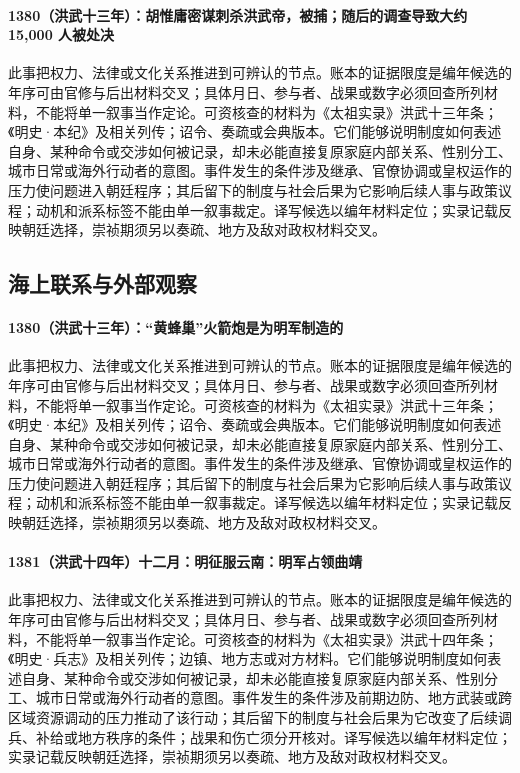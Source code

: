 \paragraph{1380（洪武十三年）：胡惟庸密谋刺杀洪武帝，被捕；随后的调查导致大约 15,000 人被处决} 此事把权力、法律或文化关系推进到可辨认的节点。账本的证据限度是编年候选的年序可由官修与后出材料交叉；具体月日、参与者、战果或数字必须回查所列材料，不能将单一叙事当作定论。可资核查的材料为《太祖实录》洪武十三年条；《明史·本纪》及相关列传；诏令、奏疏或会典版本。它们能够说明制度如何表述自身、某种命令或交涉如何被记录，却未必能直接复原家庭内部关系、性别分工、城市日常或海外行动者的意图。事件发生的条件涉及继承、官僚协调或皇权运作的压力使问题进入朝廷程序；其后留下的制度与社会后果为它影响后续人事与政策议程；动机和派系标签不能由单一叙事裁定。译写候选以编年材料定位；实录记载反映朝廷选择，崇祯期须另以奏疏、地方及敌对政权材料交叉。

\subsection{海上联系与外部观察}

\paragraph{1380（洪武十三年）：“黄蜂巢”火箭炮是为明军制造的} 此事把权力、法律或文化关系推进到可辨认的节点。账本的证据限度是编年候选的年序可由官修与后出材料交叉；具体月日、参与者、战果或数字必须回查所列材料，不能将单一叙事当作定论。可资核查的材料为《太祖实录》洪武十三年条；《明史·本纪》及相关列传；诏令、奏疏或会典版本。它们能够说明制度如何表述自身、某种命令或交涉如何被记录，却未必能直接复原家庭内部关系、性别分工、城市日常或海外行动者的意图。事件发生的条件涉及继承、官僚协调或皇权运作的压力使问题进入朝廷程序；其后留下的制度与社会后果为它影响后续人事与政策议程；动机和派系标签不能由单一叙事裁定。译写候选以编年材料定位；实录记载反映朝廷选择，崇祯期须另以奏疏、地方及敌对政权材料交叉。

\paragraph{1381（洪武十四年）十二月：明征服云南：明军占领曲靖} 此事把权力、法律或文化关系推进到可辨认的节点。账本的证据限度是编年候选的年序可由官修与后出材料交叉；具体月日、参与者、战果或数字必须回查所列材料，不能将单一叙事当作定论。可资核查的材料为《太祖实录》洪武十四年条；《明史·兵志》及相关列传；边镇、地方志或对方材料。它们能够说明制度如何表述自身、某种命令或交涉如何被记录，却未必能直接复原家庭内部关系、性别分工、城市日常或海外行动者的意图。事件发生的条件涉及前期边防、地方武装或跨区域资源调动的压力推动了该行动；其后留下的制度与社会后果为它改变了后续调兵、补给或地方秩序的条件；战果和伤亡须分开核对。译写候选以编年材料定位；实录记载反映朝廷选择，崇祯期须另以奏疏、地方及敌对政权材料交叉。

